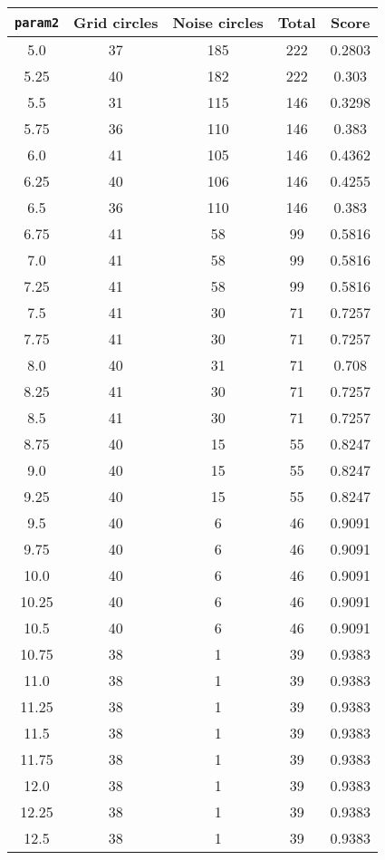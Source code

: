 \documentclass[letterpaper, 12pt]{article}
\begin{document}
\begin{longtable}{|c|c|c|c|c|}
\hline
\textbf{\texttt{param2}} & \textbf{Grid circles} & \textbf{Noise circles} & \textbf{Total} & \textbf{Score} \\
\hline
5.0 & 37 & 185 & 222 & 0.2803 \\
\hline
5.25 & 40 & 182 & 222 & 0.303 \\
\hline
5.5 & 31 & 115 & 146 & 0.3298 \\
\hline
5.75 & 36 & 110 & 146 & 0.383 \\
\hline
6.0 & 41 & 105 & 146 & 0.4362 \\
\hline
6.25 & 40 & 106 & 146 & 0.4255 \\
\hline
6.5 & 36 & 110 & 146 & 0.383 \\
\hline
6.75 & 41 & 58 & 99 & 0.5816 \\
\hline
7.0 & 41 & 58 & 99 & 0.5816 \\
\hline
7.25 & 41 & 58 & 99 & 0.5816 \\
\hline
7.5 & 41 & 30 & 71 & 0.7257 \\
\hline
7.75 & 41 & 30 & 71 & 0.7257 \\
\hline
8.0 & 40 & 31 & 71 & 0.708 \\
\hline
8.25 & 41 & 30 & 71 & 0.7257 \\
\hline
8.5 & 41 & 30 & 71 & 0.7257 \\
\hline
8.75 & 40 & 15 & 55 & 0.8247 \\
\hline
9.0 & 40 & 15 & 55 & 0.8247 \\
\hline
9.25 & 40 & 15 & 55 & 0.8247 \\
\hline
9.5 & 40 & 6 & 46 & 0.9091 \\
\hline
9.75 & 40 & 6 & 46 & 0.9091 \\
\hline
10.0 & 40 & 6 & 46 & 0.9091 \\
\hline
10.25 & 40 & 6 & 46 & 0.9091 \\
\hline
10.5 & 40 & 6 & 46 & 0.9091 \\
\hline
10.75 & 38 & 1 & 39 & 0.9383 \\
\hline
11.0 & 38 & 1 & 39 & 0.9383 \\
\hline
11.25 & 38 & 1 & 39 & 0.9383 \\
\hline
11.5 & 38 & 1 & 39 & 0.9383 \\
\hline
11.75 & 38 & 1 & 39 & 0.9383 \\
\hline
12.0 & 38 & 1 & 39 & 0.9383 \\
\hline
12.25 & 38 & 1 & 39 & 0.9383 \\
\hline
12.5 & 38 & 1 & 39 & 0.9383 \\

\end{longtable}
\end{document}
